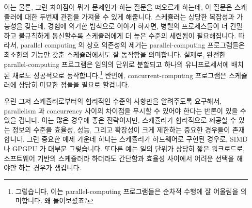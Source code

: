 이는 물론, 그런 차이점이 뭐가 문제인가 하는 질문을 떠오르게 하는데, 이 질문은
스케쥴러에 대한 두번째 관점을 가져올 수 있게 해줍니다.
스케쥴러는 상당한 복잡성과 가능성을 갖는데, 경험에 의거한 법칙으로 이야기
하자면, 병렬의 프로세스들이 더 긴밀하고 불규칙하게 통신할수록 스케쥴러에게 더
높은 수준의 세련됨이 필요해집니다.
따라서, parallel computing 의 상호 의존성의 제거는 parallel-computing
프로그램들은 최소한의 기능만 갖춘 스케쥴러에서도 잘 동작함을 의미합니다.
실제로, 완전한 parallel-computing 프로그램은 임의의 단위로 분할되고 하나의
유니프로세서에 배치된 채로도 성공적으로 동작합니다.\footnote{
	그렇습니다, 이는 parallel-computing 프로그램들은 순차적 수행에 잘
	어울림을 의미합니다.
	왜 물어보셨죠?}
반면에, concurrent-computing 프로그램은 스케쥴러에 상당히 미묘한 점들을 필요로
할겁니다.
\iffalse

This of course begs the question of why such a distinction matters,
which brings us to the second perspective, that of the underlying scheduler.
Schedulers come in a wide range of complexities and capabilities, and
as a rough rule of thumb, the more tightly and irregularly a set of
parallel processes communicate, the higher the level of sophistication
is required from the scheduler.
As such, parallel computing's avoidance of interdependencies means that
parallel-computing programs run well on the least-capable schedulers.
In fact, a pure parallel-computing program can run successfully after
being arbitrarily subdivided and interleaved onto a uniprocessor.\footnote{
	Yes, this does mean that parallel-computing programs are
	best-suited for sequential execution.
	Why did you ask?}
In contrast, concurrent-computing programs might well require extreme
subtlety on the part of the scheduler.
\fi

우린 그저 스케쥴러로부터의 합리적인 수준의 사항만을 알려주도록 요구해서,
parallelism 과 concurrency 사이의 차이점을 무시할 수 있어야 한다는 반론이 있을
수 있을 겁니다.
이는 많은 경우에 좋은 전략이지만, 스케쥴러가 합리적으로 제공할 수 있는 정보의
수준을 효율성, 성능, 그리고 확장성이 크게 제한하는 중요한 경우들이 존재합니다.
그런 중요한 예제 가운데 하나는 스케쥴러가 하드웨어로 구현된 경우로, SIMD 나
GPGPU 가 대부분 그렇습니다.
또다른 예는 일의 단위가 상당히 짧은 워크로드로, 소프트웨어 기반의 스케쥴러라
하더라도 간단함과 효율성 사이에서 어려운 선택을 해야만 하는 경우가 생깁니다.
\iffalse

One could argue that we should simply demand a reasonable level of
competence from the scheduler, so that we could simply ignore any
distinctions between parallelism and concurrency.
Although this is often a good strategy,
there are important situations where efficiency,
performance, and scalability concerns sharply limit the level
of competence that the scheduler can reasonably offer.
One important example is when the scheduler is implemented in
hardware, as it often is in SIMD units or GPGPUs.
Another example is a workload where the units of work are quite
short, so that even a software-based scheduler must make hard choices
between subtlety on the one hand and efficiency on the other.
\fi

